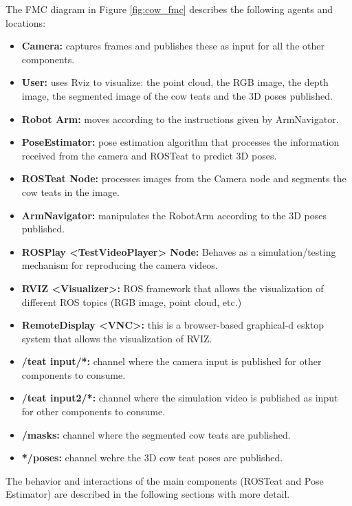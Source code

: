 \lipsum[2]
The FMC diagram in Figure \ref{fig:cow_fmc} describes the following agents and locations:
\begin{itemize}
    \item \textbf{Camera:} captures frames and publishes these as input for all the other components.
    \item \textbf{User:} uses Rviz to visualize: the point cloud, the RGB image, the depth image, the segmented image of the cow teats and the 3D poses published.
    \item \textbf{Robot Arm:} moves according to the instructions given by ArmNavigator. 
    \item \textbf{PoseEstimator:} pose estimation algorithm that processes the information received from the camera and ROSTeat to predict 3D poses.
    \item \textbf{ROSTeat Node:} processes images from the Camera node and segments the cow teats in the image.
    \item \textbf{ArmNavigator:} manipulates the RobotArm according to the 3D poses published.
    \item \textbf{ROSPlay <TestVideoPlayer> Node:} Behaves as a simulation/testing mechanism for reproducing the camera videos.
    \item \textbf{RVIZ <Visualizer>:} ROS framework that allows the visualization of different ROS topics (RGB image, point cloud, etc.)
    \item \textbf{RemoteDisplay <VNC>:} this is a browser-based graphical-d
    esktop system that allows the visualization of RVIZ.
    \item \textbf{/teat input/*:} channel where the camera input is published for other components to consume.
    \item \textbf{/teat input2/*:} channel where the simulation video is published as input for other components to consume.
    \item \textbf{/masks:} channel where the segmented cow teats are published.
    \item \textbf{*/poses:} channel wehre the 3D cow teat poses are published.
\end{itemize}

The behavior and interactions of the main components (ROSTeat and Pose Estimator) are described in the following sections with more detail.

